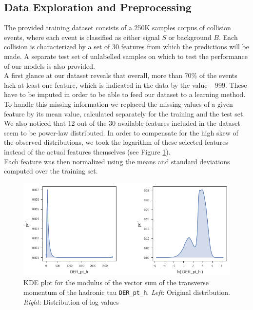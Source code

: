 \documentclass[10pt,conference,compsocconf]{IEEEtran}
\begin{document}
\subsection{Data Exploration and Preprocessing}
The provided training dataset consists of a 250K samples corpus of collision events, where each event is classified as either signal $S$ or background $B$. Each collision is characterized by a set of 30 features from which the predictions will be made. A separate test set of unlabelled samples on which to test the performance of our models is also provided. \\
A first glance at our dataset reveals that overall,
more than 70\% of the events lack at least one feature, which is indicated in the data  by the value $-999$. These have to be imputed in order to be able to feed our dataset to a learning method. To handle this missing information we replaced the missing values of a given feature by its mean value, calculated separately for the training and the test set. \\
We also noticed that 12 out of the 30 available features included in the dataset seem to be power-law distributed. In order to compensate for the high skew of the observed distributions, we took the logarithm of these selected features instead of the actual features themselves (see Figure \ref{fig_kde}).\\ Each feature was then normalized using the means and standard deviations computed over the training set. 

\begin{figure}[htb]
\centering
\includegraphics[width=0.8\linewidth]{kdeplot.png}

\cprotect\caption{KDE plot for the modulus of the vector sum of the transverse momentum of the hadronic tau \verb+DER_pt_h+.
\emph{Left}: Original distribution. \emph{Right}:  Distribution of log values}
\label{fig_kde}
\end{figure}

\end{document}
